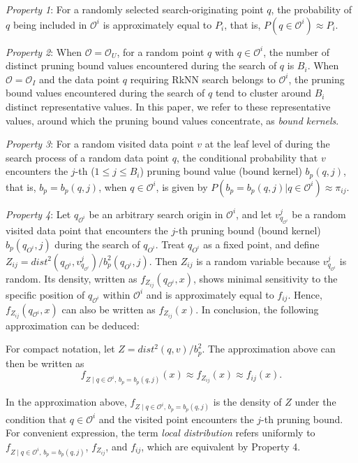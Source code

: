 \noindent \textit{Property 1}: For a randomly selected search-originating point $q$, the probability of $q$ being included in $\mathcal{O}^i$ is approximately equal to $P_i$, that is, $P(q\in \mathcal{O}^i)\approx P_i$. 

\noindent \textit{Property 2}: When $\mathcal{O}=\mathcal{O}_{U}$, for a random point $q$ with $q\in \mathcal{O}^i$, the number of distinct pruning bound values encountered during the search of $q$ is $B_i$. When $\mathcal{O}=\mathcal{O}_{I}$ and the data point $q$ requiring RkNN search belongs to $\mathcal{O}^i$, the pruning bound values encountered during the search of $q$ tend to cluster around $B_i$ distinct representative values. In this paper, we refer to these representative values, around which the pruning bound values concentrate, as \emph{bound kernels}.

\noindent \textit{Property 3}: For a random visited data point $v$ at the leaf level of \dualtree during the search process of a random data point $q$, the conditional probability that $v$ encounters the $j$-th ($1\leq j\leq B_i$) pruning bound value (bound kernel) $b_{p}(q,j)$, that is, $b_p=b_{p}(q, j)$, when $q\in \mathcal{O}^i$, is given by $P(b_p=b_{p}(q, j)|q\in \mathcal{O}^i)\approx \pi_{ij}$. 

\noindent \textit{Property 4}: Let $q_{\mathcal{O}^i}$ be an arbitrary search origin in $\mathcal{O}^i$, and let $v^{j}_{q_{\mathcal{O}^i}}$ be a random visited data point that encounters the $j$-th pruning bound (bound kernel) $b_{p}(q_{O^i},j)$ during the search of $q_{O^i}$. Treat $q_{O^i}$ as a fixed point, and define $Z_{ij}=dist^2(q_{\mathcal{O}^i},v^{j}_{q_{\mathcal{O}^i}})/b^{2}_{p}(q_{O^i},j)$. Then $Z_{ij}$ is a random variable because $v^{j}_{q_{\mathcal{O}^i}}$ is random. Its density, written as $f_{Z_{ij}}(q_{\mathcal{O}^i},x)$, shows minimal sensitivity to the specific position of $q_{\mathcal{O}^i}$ within $\mathcal{O}^i$ and is approximately equal to $f_{ij}$. Hence, $f_{Z_{ij}}(q_{\mathcal{O}^i},x)$ can also be written as $f_{Z_{ij}}(x)$. In conclusion, the following approximation can be deduced:

For compact notation, let $Z=dist^2(q,v)/b_p^2$. The approximation above can then be written as
\begin{equation}
f_{Z\mid q\in \mathcal{O}^i,\,b_p=b_p(q,j)}(x)
\approx f_{Z_{ij}}(x)
\approx f_{ij}(x).
\label{equ: local_distribution}
\end{equation}

In the approximation above, $f_{Z\mid q\in \mathcal{O}^i,\,b_p=b_p(q,j)}$ is the density of $Z$ under the condition that $q\in\mathcal{O}^i$ and the visited point encounters the $j$-th pruning bound. For convenient expression, the term \emph{local distribution} refers uniformly to $f_{Z\mid q\in \mathcal{O}^i,\,b_p=b_p(q,j)}$, $f_{Z_{ij}}$, and $f_{ij}$, which are equivalent by Property 4.  

